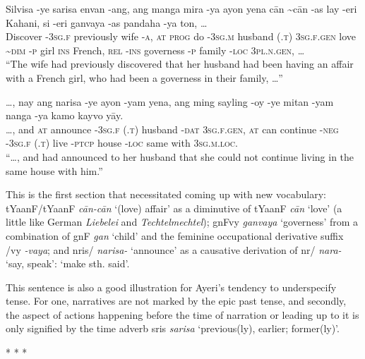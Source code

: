 \documentclass[12pt,paper=letter]{scrartcl}
\newcommand{\fw}[1]{\textit{#1}} %
\newcommand{\q}[1]{\enquote{#1}} %
\newcommand{\qq}[1]{\enquote*{#1}} %
\newcommand{\divider}{\vspace{0.5\baselineskip} \centerline{* * *} \vspace{0.5\baselineskip}}
\newcommand{\mor}[1]{\textsc{\lowercase{#1}}}
\newcommand{\ayr}[1]{{\Tagati #1}}
\begin{document}
\begin{exe} %
    \ex
    \begin{xlist}
	\ex \gll Silvisa -ye sarisa envan -ang, ang manga mira -ya ayon {} yena 
	    cān \textasciitilde{}cān -as lay -eri Kahani, si -eri ganvaya -as 
	    pandaha -ya ton, … \\
	Discover \mor{-3SG.F} previously wife \mor{-A}, \mor{AT} \mor{PROG} do
	    \mor{-3SG.M} husband \mor{(.T)} \mor{3SG.F.GEN} love 
	    \mor{\textasciitilde{}DIM} \mor{-P} girl \mor{INS} French, 
	    \mor{REL} \mor{-INS} governess \mor{-P} family \mor{-LOC} 
	    \mor{3PL.N.GEN}, … \\
	\glt \q{The wife had previously discovered that her husband
	    had been having an affair with a French girl, who had been a
	    governess in their family, …}
	
	\ex \gll …, nay ang narisa -ye {} ayon -yam yena, ang ming sayling -oy 
	    -ye {} mitan -yam nanga -ya kamo kayvo yāy. \\
	…, and \mor{AT} announce \mor{-3SG.F} \mor{(.T)} husband \mor{-DAT}
	    \mor{3SG.F.GEN}, \mor{AT} can continue \mor{-NEG} \mor{-3SG.F} 
	    \mor{(.T)} live \mor{-PTCP} house \mor{-LOC} same with 
	    \mor{3SG.M.LOC}. \\
	\glt \q{…, and had announced to her husband that she could not 
	    continue living in the same house with him.}
    \end{xlist}
\end{exe}

This is the first section that necessitated coming up with new vocabulary:
\ayr{tYaanF/tYaanF} \fw{cān-cān} \qq{(love) affair} as a diminutive of 
\ayr{tYaanF} \fw{cān} \qq{love} (a little like German \fw{Liebelei} and 
\fw{Techtelmechtel}); \ayr{gnFvy} \fw{ganvaya} \qq{governess} from a 
combination of \ayr{gnF} \fw{gan} \qq{child} and the feminine occupational 
derivative suffix \ayr{/vy} \fw{-vaya}; and \ayr{nris/} \fw{narisa-} 
\qq{announce} as a causative derivation of \ayr{nr/} \fw{nara-} \qq{say, 
speak}: \qq{make sth. said}.

This sentence is also a good illustration for Ayeri's tendency to underspecify
tense. For one, narratives are not marked by the epic past tense, and secondly,
the aspect of actions happening before the time of narration or leading up to it
is only signified by the time adverb \ayr{sris} \fw{sarisa} \qq{previous(ly), 
earlier; former(ly)}.

\divider
\end{document}
